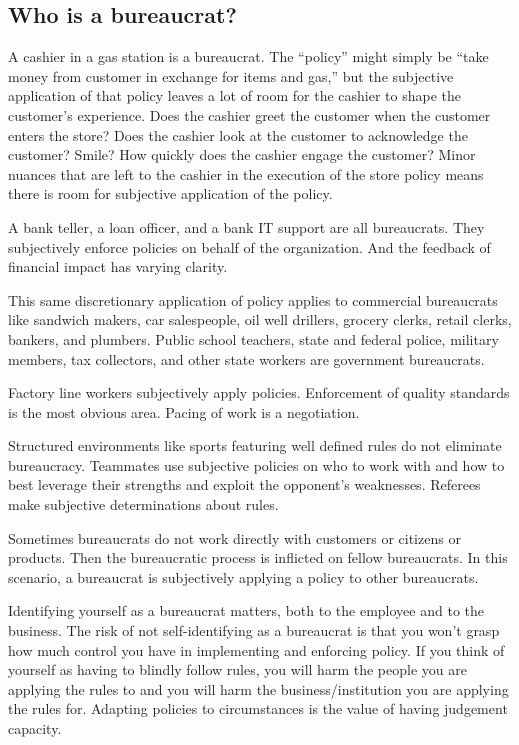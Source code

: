 \subsection{Who is a bureaucrat?}

A cashier in a gas station is a bureaucrat. The ``policy'' might simply be ``take money from customer in exchange for items and gas,'' but the subjective application of that policy leaves a lot of room for the cashier to shape the customer's experience. Does the cashier greet the customer when the customer enters the store? Does the cashier look at the customer to acknowledge the customer? Smile? How quickly does the cashier engage the customer? Minor nuances that are left to the cashier in the execution of the store policy means there is room for subjective application of the policy. 

A bank teller, a loan officer, and a bank IT support are all bureaucrats. They subjectively enforce policies on behalf of the organization. And the feedback of financial impact has varying clarity.


This same discretionary application of policy applies to commercial bureaucrats like sandwich makers, car salespeople, oil well drillers, grocery clerks, retail clerks, bankers, and plumbers. Public school teachers, state and federal police, military members, tax collectors, and other state workers are government bureaucrats. 




Factory line workers subjectively apply policies. Enforcement of quality standards is the most obvious area. Pacing of work is a negotiation.

Structured environments like sports featuring well defined rules do not eliminate bureaucracy. Teammates use subjective policies on who to work with and how to best leverage their strengths and exploit the opponent's weaknesses. Referees make subjective determinations about rules.

Sometimes bureaucrats do not work directly with customers or citizens or products. Then the bureaucratic process is inflicted on fellow bureaucrats. In this scenario, a bureaucrat is subjectively applying a policy to other bureaucrats. 

Identifying yourself as a bureaucrat matters, both to the employee and to the business. The risk of not self-identifying as a bureaucrat is that you won't grasp how much control you have in implementing and enforcing policy. If you think of yourself as having to blindly follow rules, you will harm the people you are applying the rules to and you will harm the business/institution you are applying the rules for. Adapting policies to circumstances is the value of having judgement capacity. 

